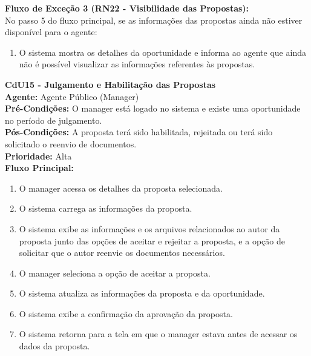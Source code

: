 \noindent\textbf{Fluxo de Exceção 3 (RN22 - Visibilidade das Propostas):}\\
No passo 5 do fluxo principal, se as informações das propostas ainda não estiver disponível para o agente:
\begin{enumerate}[noitemsep, topsep=-5pt, parsep=0pt]
    \item O sistema mostra os detalhes da oportunidade e informa ao agente que ainda não é possível visualizar as informações referentes às propostas.
\end{enumerate}

\vspace{7pt}
\noindent\textbf{\normalsize CdU15 - Julgamento e Habilitação das Propostas}\\
\noindent\textbf{Agente:} Agente Público (Manager)\\ 
\textbf{Pré-Condições:} O manager está logado no sistema e existe uma oportunidade no período de julgamento.\\ 
\textbf{Pós-Condições:} A proposta terá sido habilitada, rejeitada ou terá sido solicitado o reenvio de documentos.\\
\textbf{Prioridade:} Alta \vspace{3pt}\\
\noindent\textbf{Fluxo Principal:}
\begin{enumerate}[noitemsep, topsep=-5pt, parsep=0pt]
    \item O manager acessa os detalhes da proposta selecionada.
    \item O sistema carrega as informações da proposta.
    \item O sistema exibe as informações e os arquivos relacionados ao autor da proposta junto das opções de aceitar e rejeitar a proposta, e a opção de solicitar que o autor reenvie os documentos necessários.
    \item O manager seleciona a opção de aceitar a proposta.
    \item O sistema atualiza as informações da proposta e da oportunidade.
    \item O sistema exibe a confirmação da aprovação da proposta.
    \item O sistema retorna para a tela em que o manager estava antes de acessar os dados da proposta.
\end{enumerate}

